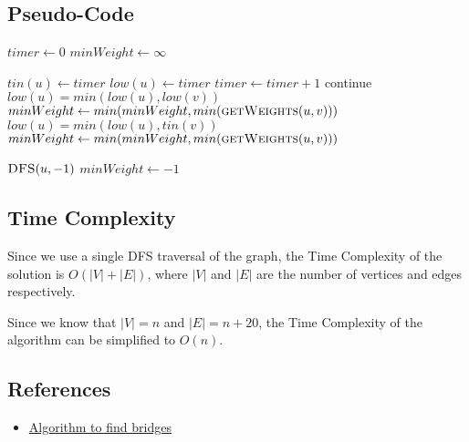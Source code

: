 \documentclass{article}
\begin{document}
\subsection{Pseudo-Code}

\begin{algorithmic}[1]

\State $timer \gets 0$  
\State $minWeight \gets \infty$ 

\State $tin(u) \gets timer$
\State $low(u) \gets timer$
\State $timer \gets timer + 1$
 
\State continue
 
\State {} 
\State $low(u) = min(low(u), low(v))$
\State $minWeight \gets min(minWeight, min(\Call{getWeights}{u, v}))$
\EndIf
\Else {}
\State $low(u) = min(low(u), tin(v))$
\State $minWeight \gets min(minWeight, min(\Call{getWeights}{u, v}))$
\EndIf
\EndFor
\EndProcedure

\State $\Call{DFS}{u, -1}$
\EndIf
\EndFor
{} 
\State $minWeight \gets -1$
\EndIf
\State {}
\EndProcedure

\end{algorithmic}


\subsection{Time Complexity}

Since we use a single DFS traversal of the graph, the Time Complexity of the solution is $O(|V| + |E|)$, where $|V|$ and $|E|$ are the number of vertices and edges respectively.

Since we know that $|V| = n$ and $|E| = n + 20$, the Time Complexity of the algorithm can be simplified to $O(n)$.

\subsection{References}

\begin{itemize}
    \item \href{https://cp-algorithms.com/graph/bridge-searching.html}{Algorithm to find bridges}
\end{itemize}
\end{document}
